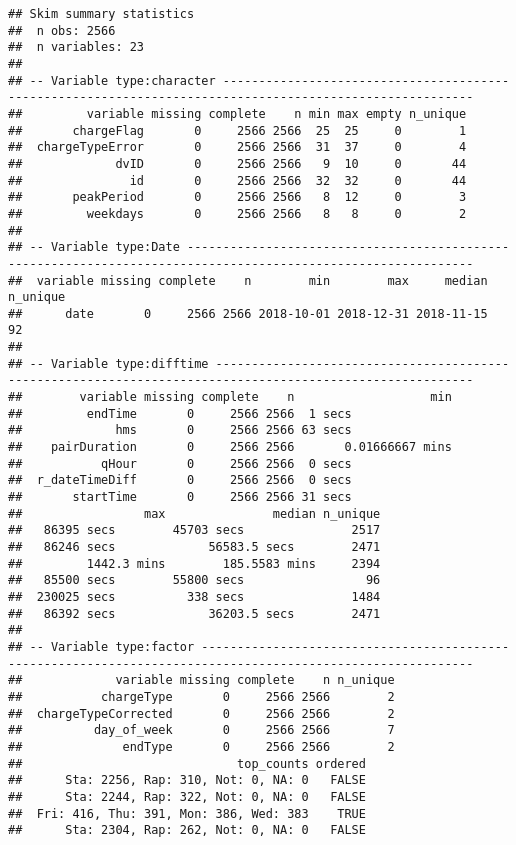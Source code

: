 \documentclass[]{article}
\begin{document}
\begin{verbatim}
## Skim summary statistics
##  n obs: 2566 
##  n variables: 23 
## 
## -- Variable type:character ---------------------------------------------------------------------------------------------------------
##         variable missing complete    n min max empty n_unique
##       chargeFlag       0     2566 2566  25  25     0        1
##  chargeTypeError       0     2566 2566  31  37     0        4
##             dvID       0     2566 2566   9  10     0       44
##               id       0     2566 2566  32  32     0       44
##       peakPeriod       0     2566 2566   8  12     0        3
##         weekdays       0     2566 2566   8   8     0        2
## 
## -- Variable type:Date --------------------------------------------------------------------------------------------------------------
##  variable missing complete    n        min        max     median n_unique
##      date       0     2566 2566 2018-10-01 2018-12-31 2018-11-15       92
## 
## -- Variable type:difftime ----------------------------------------------------------------------------------------------------------
##        variable missing complete    n                   min
##         endTime       0     2566 2566  1 secs              
##             hms       0     2566 2566 63 secs              
##    pairDuration       0     2566 2566       0.01666667 mins
##           qHour       0     2566 2566  0 secs              
##  r_dateTimeDiff       0     2566 2566  0 secs              
##       startTime       0     2566 2566 31 secs              
##                 max               median n_unique
##   86395 secs        45703 secs               2517
##   86246 secs             56583.5 secs        2471
##         1442.3 mins        185.5583 mins     2394
##   85500 secs        55800 secs                 96
##  230025 secs          338 secs               1484
##   86392 secs             36203.5 secs        2471
## 
## -- Variable type:factor ------------------------------------------------------------------------------------------------------------
##             variable missing complete    n n_unique
##           chargeType       0     2566 2566        2
##  chargeTypeCorrected       0     2566 2566        2
##          day_of_week       0     2566 2566        7
##              endType       0     2566 2566        2
##                              top_counts ordered
##      Sta: 2256, Rap: 310, Not: 0, NA: 0   FALSE
##      Sta: 2244, Rap: 322, Not: 0, NA: 0   FALSE
##  Fri: 416, Thu: 391, Mon: 386, Wed: 383    TRUE
##      Sta: 2304, Rap: 262, Not: 0, NA: 0   FALSE

\end{verbatim}
\end{document}
